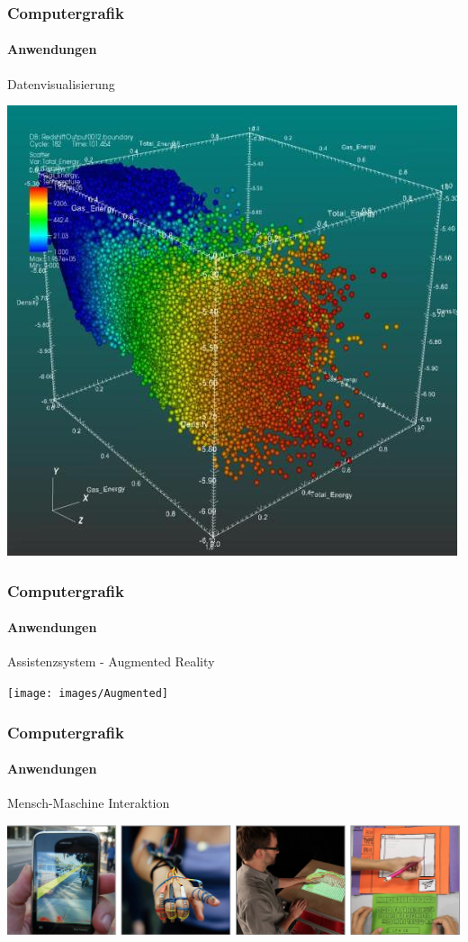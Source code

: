 \documentclass{beamer}
\begin{document}
\begin{frame}
\frametitle{Computergrafik}
\framesubtitle{Anwendungen}
 \begin{block}{Datenvisualisierung}
\begin{center}
\includegraphics[scale=0.3]{images/Scatter_plot}
\end{center}
\end{block}
\end{frame}



\begin{frame}
\frametitle{Computergrafik}
\framesubtitle{Anwendungen}
 \begin{block}{Assistenzsystem - Augmented Reality}
\begin{center}
\texttt{[image: images/Augmented]}
\end{center}
\end{block}
\end{frame}



\begin{frame}
\frametitle{Computergrafik}
\framesubtitle{Anwendungen}
 \begin{block}{Mensch-Maschine Interaktion}
\begin{center}
\includegraphics[scale=0.55]{images/HCI}
\end{center}
\end{block}
\end{frame}
\end{document}
